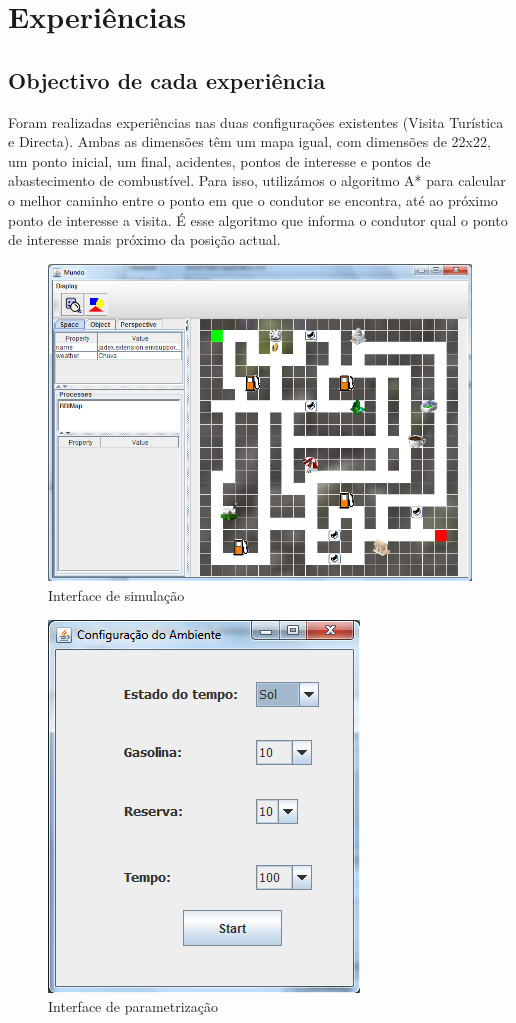 \documentclass[15pt,a4paper]{article}
\begin{document}
\newpage
\section{Experiências}
\subsection{Objectivo de cada experiência}
Foram realizadas experiências nas duas configurações existentes (Visita Turística e Directa). Ambas as dimensões têm um mapa igual, com dimensões de 22x22, um ponto inicial, um final, acidentes, pontos de interesse e pontos de abastecimento de combustível. Para isso, utilizámos o algoritmo A* para calcular o melhor caminho entre o ponto em que o condutor se encontra, até ao próximo ponto de interesse a visita. É esse algoritmo que informa o condutor qual o ponto de interesse mais próximo da posição actual.

\begin{figure}[htp]
  \centering
  \includegraphics[scale=0.5]{mapa_mundo.png}
  \caption{Interface de simulação}
\end{figure}

\begin{figure}[htp]
  \centering
  \includegraphics[scale=0.6]{launch_config.png}
  \caption{Interface de parametrização}
\end{figure}
\end{document}
